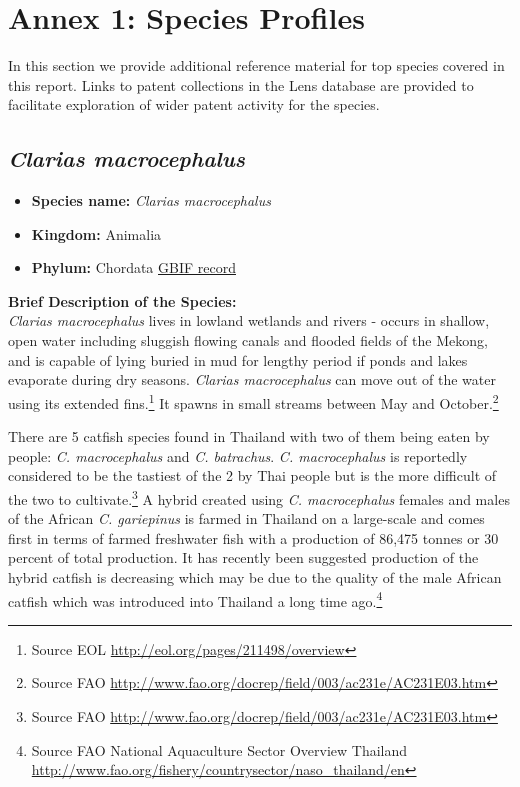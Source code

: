 \documentclass[openany]{book}
\providecommand{\tightlist}{%
  \setlength{\itemsep}{0pt}\setlength{\parskip}{0pt}}
\let\rmarkdownfootnote\footnote%
\def\footnote{\protect\rmarkdownfootnote}
\theoremstyle{definition}
\theoremstyle{definition}
\theoremstyle{definition}
\theoremstyle{remark}
\begin{document}
\hypertarget{species}{%
\chapter{Annex 1: Species Profiles}\label{species}}

In this section we provide additional reference material for top species
covered in this report. Links to patent collections in the Lens database
are provided to facilitate exploration of wider patent activity for the
species.

\hypertarget{clarias-macrocephalus}{%
\section{\texorpdfstring{\emph{Clarias
macrocephalus}}{Clarias macrocephalus}}\label{clarias-macrocephalus}}

\begin{itemize}
\tightlist
\item
  \textbf{Species name:} \emph{Clarias macrocephalus}
\item
  \textbf{Kingdom:} Animalia\\
\item
  \textbf{Phylum:} Chordata
  \href{https://www.gbif.org/species/5202728}{GBIF record}
\end{itemize}

\textbf{Brief Description of the Species:}\\
\emph{Clarias macrocephalus} lives in lowland wetlands and rivers -
occurs in shallow, open water including sluggish flowing canals and
flooded fields of the Mekong, and is capable of lying buried in mud for
lengthy period if ponds and lakes evaporate during dry seasons.
\emph{Clarias macrocephalus} can move out of the water using its
extended fins.\footnote{Source EOL
  \url{http://eol.org/pages/211498/overview}} It spawns in small streams
between May and October.\footnote{Source FAO
  \url{http://www.fao.org/docrep/field/003/ac231e/AC231E03.htm}}

There are 5 catfish species found in Thailand with two of them being
eaten by people: \emph{C. macrocephalus} and \emph{C. batrachus}.
\emph{C. macrocephalus} is reportedly considered to be the tastiest of
the 2 by Thai people but is the more difficult of the two to
cultivate.\footnote{Source FAO
  \url{http://www.fao.org/docrep/field/003/ac231e/AC231E03.htm}} A
hybrid created using \emph{C. macrocephalus} females and males of the
African \emph{C. gariepinus} is farmed in Thailand on a large-scale and
comes first in terms of farmed freshwater fish with a production of
86,475 tonnes or 30 percent of total production. It has recently been
suggested production of the hybrid catfish is decreasing which may be
due to the quality of the male African catfish which was introduced into
Thailand a long time ago.\footnote{Source FAO National Aquaculture
  Sector Overview Thailand
  \url{http://www.fao.org/fishery/countrysector/naso_thailand/en}}
\end{document}
